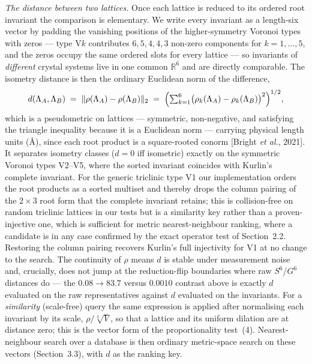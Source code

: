 \documentclass[11pt]{article}
\newcommand{\rootinv}{\rho}
\begin{document}
\emph{The distance between two lattices.} Once each lattice is reduced to its
ordered root invariant the comparison is elementary. We write every invariant as
a length-six vector by padding the vanishing positions of the higher-symmetry
Voronoi types with zeros --- type V$k$ contributes $6,5,4,4,3$ non-zero
components for $k=1,\dots,5$, and the zeros occupy the same ordered slots for
every lattice --- so invariants of \emph{different} crystal systems live in one
common $\mathbb{R}^6$ and are directly comparable. The isometry distance is then
the ordinary Euclidean norm of the difference,
\begin{equation}
\label{eq:dist}
d(\Lambda_A, \Lambda_B) \;=\; \lVert \rootinv(\Lambda_A) - \rootinv(\Lambda_B)
\rVert_2 \;=\; \Bigl(\textstyle\sum_{k=1}^{6}
\bigl(\rootinv_k(\Lambda_A) - \rootinv_k(\Lambda_B)\bigr)^2\Bigr)^{1/2},
\end{equation}
which is a pseudometric on lattices --- symmetric, non-negative, and satisfying
the triangle inequality because it is a Euclidean norm --- carrying physical
length units (\r{A}), since each root product is a square-rooted conorm [Bright
\textit{et al.}, 2021]. It separates isometry classes ($d = 0$ iff isometric)
exactly on the symmetric Voronoi types V2--V5, where the sorted invariant
coincides with Kurlin's complete invariant. For the generic triclinic type V1 our
implementation orders the root products as a sorted multiset and thereby drops
the column pairing of the $2\times3$ root form that the complete invariant
retains; this is collision-free on random triclinic lattices in our tests but is
a similarity key rather than a proven-injective one, which is sufficient for
metric nearest-neighbour ranking, where a candidate is in any case confirmed by
the exact operator test of Section~2.2. Restoring the column pairing recovers
Kurlin's full injectivity for V1 at no change to the search. The continuity of $\rootinv$
means $d$ is stable under measurement noise and, crucially, does not jump at the
reduction-flip boundaries where raw $S^6$/$G^6$ distances do --- the $0.08 \to
83.7$ versus $0.0010$ contrast above is exactly $d$ evaluated on the raw
representatives against $d$ evaluated on the invariants. For a \emph{similarity}
(scale-free) query the same expression is applied after normalising each
invariant by its scale, $\rootinv/\sqrt[3]{V}$, so that a lattice and its uniform
dilation are at distance zero; this is the vector form of the proportionality
test~(4). Nearest-neighbour search over a database is then ordinary metric-space
search on these vectors (Section~3.3), with $d$ as the ranking key.
\end{document}
